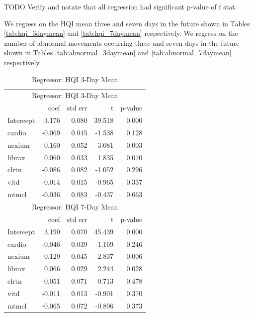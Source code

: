 \documentclass[conference]{IEEEtran}
\begin{document}
TODO Verify and notate that all regression had significant p-value of f stat.

We regress on the HQI mean three and seven days in the future shown in Tables \ref{tab:hqi_3daymean} and \ref{tab:hqi_7daymean} respectively. We regress on the number of abnormal movements occurring three and seven days in the future shown in Tables \ref{tab:abnormal_3daymean} and \ref{tab:abnormal_7daymean} respectively.

\begin{table}
\begin{center}
\caption {Regressor: HQI 3-Day Mean} \label{tab:hqi_mean}
    \begin{tabular}{ | l | r | r | r | r |}    
    \hline
    \multicolumn{5}{|c|}{Regressor: HQI 3-Day Mean} \\
     & coef & std err & t & p-value \\ \hline
Intercept & 3.176 & 0.080 & 39.518 & 0.000 \\
cardio & -0.069 & 0.045 & -1.538 & 0.128 \\
nexium & 0.160 & 0.052 & 3.081 & 0.003 \\
librax & 0.060 & 0.033 & 1.835 & 0.070 \\
clrtn & -0.086 & 0.082 & -1.052 & 0.296 \\
vitd & -0.014 & 0.015 & -0.965 & 0.337 \\
mtmcl & -0.036 & 0.083 & -0.437 & 0.663 \\
    \hline
    \multicolumn{5}{|c|}{Regressor: HQI 7-Day Mean} \\
    \hline
     & coef & std err & t & p-value \\ \hline
Intercept & 3.190 & 0.070 & 45.439 & 0.000 \\
cardio & -0.046 & 0.039 & -1.169 & 0.246 \\
nexium & 0.129 & 0.045 & 2.837 & 0.006 \\
librax & 0.066 & 0.029 & 2.244 & 0.028 \\
clrtn & -0.051 & 0.071 & -0.713 & 0.478 \\
vitd & -0.011 & 0.013 & -0.901 & 0.370 \\
mtmcl & -0.065 & 0.072 & -0.896 & 0.373 \\
    \hline
    \end{tabular}
\end{center}
\end{table}
\end{document}
